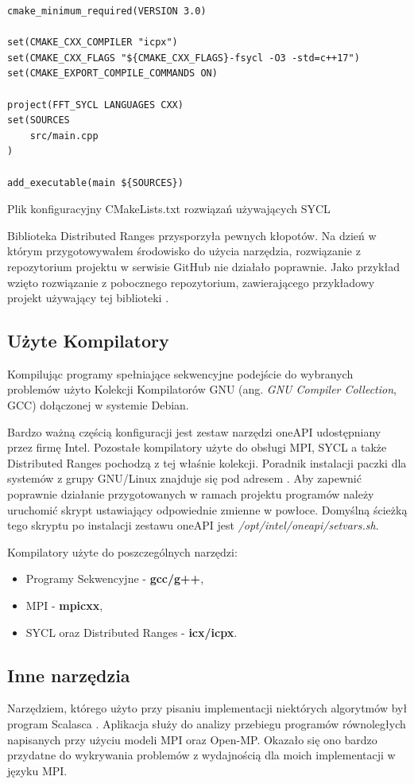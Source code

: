 \documentclass[a4paper,12pt]{book} %
\begin{document}
\begin{lstfloat}
\begin{lstlisting}[frame=single]
cmake_minimum_required(VERSION 3.0)

set(CMAKE_CXX_COMPILER "icpx")
set(CMAKE_CXX_FLAGS "${CMAKE_CXX_FLAGS}-fsycl -O3 -std=c++17")
set(CMAKE_EXPORT_COMPILE_COMMANDS ON)

project(FFT_SYCL LANGUAGES CXX)
set(SOURCES 
    src/main.cpp
)

add_executable(main ${SOURCES})
\end{lstlisting}
\caption{Plik konfiguracyjny CMakeLists.txt rozwiązań używających SYCL}
\label{lst::cmake-SYCL}
\end{lstfloat}

Biblioteka Distributed Ranges przysporzyła pewnych kłopotów. Na dzień w którym przygotowywałem środowisko do użycia narzędzia, rozwiązanie z repozytorium projektu w serwisie GitHub nie działało poprawnie. Jako przykład wzięto rozwiązanie z pobocznego repozytorium, zawierającego przykładowy projekt używający tej biblioteki \cite{dist-ranges-tutorial}.
\subsection{Użyte Kompilatory}
Kompilując programy spełniające sekwencyjne podejście do wybranych problemów użyto Kolekcji Kompilatorów GNU (ang. \emph{GNU Compiler Collection}, GCC) dołączonej w systemie Debian.

Bardzo ważną częścią konfiguracji jest zestaw narzędzi oneAPI udostępniany przez firmę Intel. Pozostałe kompilatory użyte do obsługi MPI, SYCL a także Distributed Ranges pochodzą z tej właśnie kolekcji. Poradnik instalacji paczki dla systemów z grupy GNU/Linux znajduje się pod adresem \cite{oneapi-install}. Aby zapewnić poprawnie działanie przygotowanych w ramach projektu programów należy uruchomić skrypt ustawiający odpowiednie zmienne w powłoce. Domyślną ścieżką tego skryptu po instalacji zestawu oneAPI jest \emph{/opt/intel/oneapi/setvars.sh}.

Kompilatory użyte do poszczególnych narzędzi:
\begin{itemize}
\item Programy Sekwencyjne - \textbf{gcc/g++},
\item MPI - \textbf{mpicxx},
\item SYCL oraz Distributed Ranges - \textbf{icx/icpx}.
\end{itemize}

\subsection{Inne narzędzia}
Narzędziem, którego użyto przy pisaniu implementacji niektórych algorytmów był program Scalasca \cite{scalasca}. Aplikacja służy do analizy przebiegu programów równoległych napisanych przy użyciu modeli MPI oraz Open-MP. Okazało się ono bardzo przydatne do wykrywania problemów z wydajnością dla moich implementacji w języku MPI.
\end{document}
